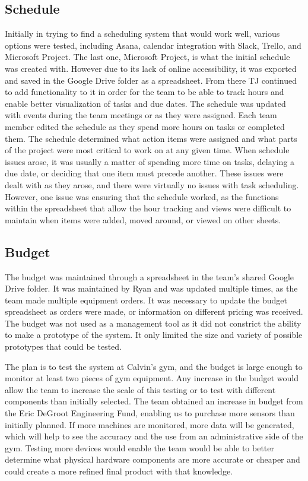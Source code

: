 \documentclass[PPFS.tex]{template/subfiles}
\begin{document}
    \subsection{Schedule}
	Initially in trying to find a scheduling system that would work well, various options were tested, including Asana, calendar integration with Slack, Trello, and Microsoft Project. The last one, Microsoft Project, is what the initial schedule was created with. However due to its lack of online accessibility, it was exported and saved in the Google Drive folder as a spreadsheet. From there TJ continued to add functionality to it in order for the team to be able to track hours and enable better visualization of tasks and due dates. The schedule was updated with events during the team meetings or as they were assigned. Each team member edited the schedule as they spend more hours on tasks or completed them. The schedule determined what action items were assigned and what parts of the project were most critical to work on at any given time. When schedule issues arose, it was usually a matter of spending more time on tasks, delaying a due date, or deciding that one item must precede another. These issues were dealt with as they arose, and there were virtually no issues with task scheduling. However, one issue was ensuring that the schedule worked, as the functions within the spreadsheet that allow the hour tracking and views were difficult to maintain when items were added, moved around, or viewed on other sheets.
	
    \subsection{Budget}
    The budget was maintained through a spreadsheet in the team's shared Google Drive folder. It was maintained by Ryan and was updated multiple times, as the team made multiple equipment orders. It was necessary to update the budget spreadsheet as orders were made, or information on different pricing was received. The budget was not used as a management tool as it did not constrict the ability to make a prototype of the system. It only limited the size and variety of possible prototypes that could be tested.
    
    The plan is to test the system at Calvin's gym, and the budget is large enough to monitor at least two pieces of gym equipment. Any increase in the budget would allow the team to increase the scale of this testing or to test with different components than initially selected. The team obtained an increase in budget from the Eric DeGroot Engineering Fund, enabling us to purchase more sensors than initially planned. If more machines are monitored, more data will be generated, which will help to see the accuracy and the use from an administrative side of the gym. Testing more devices would enable the team would be able to better determine what physical hardware components are more accurate or cheaper and could create a more refined final product with that knowledge. 
    
\end{document}
